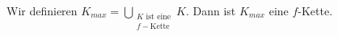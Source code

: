 \begin{lemma}[Vereinigung]
Wir definieren $K_{max} = \bigcup_{\substack{K \text{ ist eine} \\f-\text{Kette}}} K$.
	Dann ist $K_{max}$ eine $f$-Kette.
\end{lemma}





























